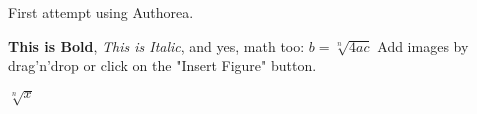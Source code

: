 First attempt using Authorea.

\textbf{This is Bold}, \textit{This is Italic}, and yes, math too: $ b= \sqrt[n]{4ac}$ Add images by drag'n'drop or click on the "Insert Figure" button.

$\sqrt[n]{x}$